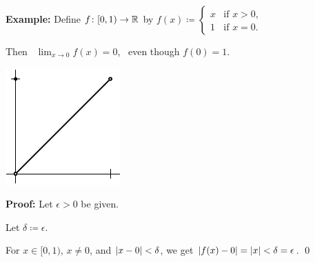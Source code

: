 \documentclass[10pt,aspectratio=169]{beamer}
\begin{document}
\begin{frame}

\textbf{Example:}
Define $f \colon [0,1) \to {\mathbb{R}}$ by
\quad
$\displaystyle
f(x) \coloneqq 
\begin{cases}
x & \text{if } x > 0 , \\
1 & \text{if } x = 0 .
\end{cases}$

\pause
\medskip

Then
~$\displaystyle\lim_{x\to 0} f(x) = 0$,~
even though $f(0) = 1$.

\pause
\medskip

\begin{center}
\includegraphics{../figures/limvaldiff}
\end{center}

\pause

\textbf{Proof:}  Let $\epsilon > 0$ be given.

\pause
Let $\delta \coloneqq \epsilon$.

\pause
For $x \in [0,1)$, $x \not= 0$, and $\left\lvert {x-0} \right\rvert < \delta$, we get
\quad
$\left\lvert {f(x) - 0} \right\rvert = \left\lvert {x} \right\rvert < \delta = \epsilon$.
\qed

\end{frame}
\end{document}
